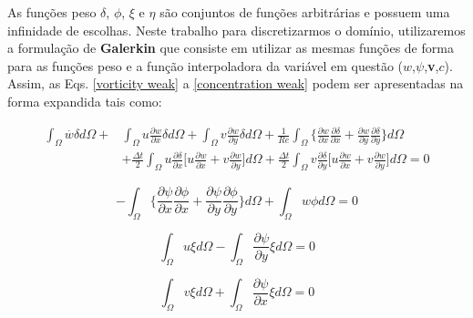 As funções peso $\delta$, $\phi$, $\xi$ e $\eta$ são conjuntos
de funções arbitrárias e possuem uma infinidade
de escolhas.
Neste trabalho para discretizarmos o domínio, 
utilizaremos a formulação de \textbf{Galerkin}
que consiste em utilizar as mesmas funções de forma
para as funções peso e a função interpoladora da variável
em questão ($w$,$\psi$,\textbf{v},$c$).
Assim, as Eqs. \ref{vorticity weak} a \ref{concentration weak}
podem ser apresentadas na forma expandida tais como:

\begin{equation} 
\begin{aligned}
   \int_{\Omega} \overset{.}{w} \delta d\Omega 
 + & \int_{\Omega} u \frac{\partial w}{\partial x} \delta d\Omega 
 + \int_{\Omega} v \frac{\partial w}{\partial y} \delta d\Omega 
 + \frac{1}{\textit{Re}} \int_{\Omega} \Bigg\{ \frac{\partial w}{\partial x} \frac{\partial \delta}{\partial x} 
 + \frac{\partial w}{\partial y} \frac{\partial \delta}{\partial y} \Bigg\} d\Omega 
 \\[5pt]
 & + \frac{\Delta t}{2} \int_{\Omega} u \frac{\partial \delta}{\partial x}
 \Bigg[
   u \frac{\partial w}{\partial x}
 + v \frac{\partial w}{\partial y}
 \Bigg] d\Omega
 + \frac{\Delta t}{2} \int_{\Omega} v \frac{\partial \delta}{\partial y}
 \Bigg[
   u \frac{\partial w}{\partial x}
 + v \frac{\partial w}{\partial y}
 \Bigg] d\Omega
 = 0
\end{aligned}
\end{equation}

\begin{equation}
 - \int_{\Omega} \Bigg\{ \frac{\partial \psi}{\partial x} \frac{\partial \phi}{\partial x} 
 + \frac{\partial \psi}{\partial y} \frac{\partial \phi}{\partial y} \Bigg\} d\Omega
 + \int_{\Omega} w \phi d\Omega = 0
\end{equation}

\begin{equation}
   \int_{\Omega} u \xi d\Omega
 - \int_{\Omega} \frac{\partial \psi}{\partial y} \xi d\Omega = 0
\end{equation}

\begin{equation}
   \int_{\Omega} v \xi d\Omega
 + \int_{\Omega} \frac{\partial \psi}{\partial x} \xi d\Omega = 0
\end{equation}

